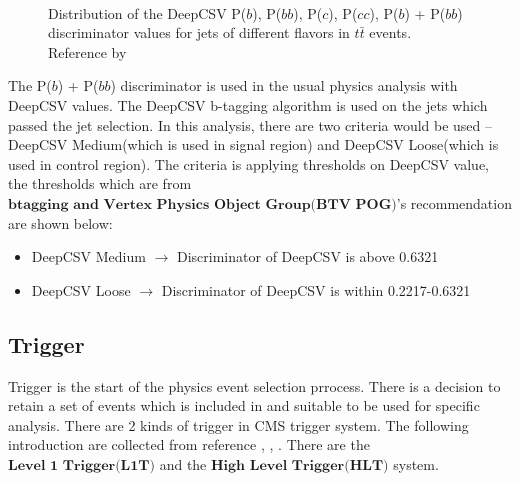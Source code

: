 			\FloatBarrier
			\begin{figure}[H]
			\centering
			    \\
			\caption{Distribution of the DeepCSV P($b$), P($bb$), P($c$), P($cc$), P($b$) + P($bb$) discriminator values for jets of different flavors in $t\bar{t}$ events. Reference by \cite{CMS-BTV-16-002}}
			\label{PhysObj:fig:flavor_discr}
			\end{figure}
			\FloatBarrier

			The P($b$) + P($bb$) discriminator is used in the usual physics analysis with DeepCSV values. The DeepCSV b-tagging algorithm is used on the jets which passed the jet selection. In this analysis, there are two criteria would be used -- DeepCSV Medium(which is used in signal region) and DeepCSV Loose(which is used in control region). The criteria is applying thresholds on DeepCSV value, the thresholds which are from $\textbf{btagging and Vertex Physics Object Group(BTV POG)}$'s\cite{btvpog_twiki} recommendation\cite{btagrecommendation_twiki} are shown below:

			\begin{itemize}
				\item DeepCSV Medium $\rightarrow$ Discriminator of DeepCSV is above 0.6321
				\item DeepCSV Loose $\rightarrow$ Discriminator of DeepCSV is within 0.2217-0.6321
			\label{PhysObj:itm:btag}
			\end{itemize}

	\subsection{Trigger}
	\label{ssec:PhysObj_trg}
		Trigger is the start of the physics event selection prrocess. There is a decision to retain a set of events which is included in and suitable to be used for specific analysis. There are 2 kinds of trigger in CMS trigger system. The following introduction are collected from reference \cite{Dasu:2000ge}, \cite{Cadamuro_2017}, \cite{Trocino_2014} . There are the $\textbf{Level 1 Trigger(L1T)}$ and the $\textbf{High Level Trigger(HLT)}$ system.

